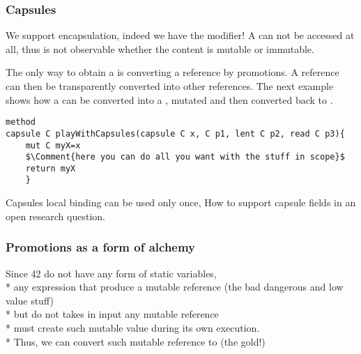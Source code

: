 \begin{frame}[fragile]
\frametitle{Capsules}
We support encapsulation, indeed we have the \Q@capsule@ modifier!
A \Q@capsule@ can not be accessed at all, thus is not observable
 whether the content is mutable or immutable.

The only way to obtain a \Q@capsule@ is converting a  \Q@mut@ reference by promotions.
A \Q@capsule@ reference can then be transparently converted into other references.
The next example shows how a \Q@capsule@ can be converted into a \Q@mut@, mutated and then converted back to \Q@capsule@.
\begin{NiceCode}{59ex}{0.8}
\begin{lstlisting}
method
capsule C playWithCapsules(capsule C x, C p1, lent C p2, read C p3){
    mut C myX=x
    $\Comment{here you can do all you want with the stuff in scope}$
    return myX
    }
\end{lstlisting}
\end{NiceCode}
Capsules local binding can be used only once,
How to support capsule fields in an open research question.
\end{frame}

\begin{frame}[fragile]
\frametitle{Promotions as a form of alchemy }
Since 42 do not have any form of static variables,\\*
any expression that produce a mutable reference (the bad dangerous and low value stuff)\\*
but do not takes in input any mutable reference\\*
must create such mutable value during its own execution.\\*
Thus, we can convert such mutable reference to \Q@capsule@ (the gold!)

\end{frame}

